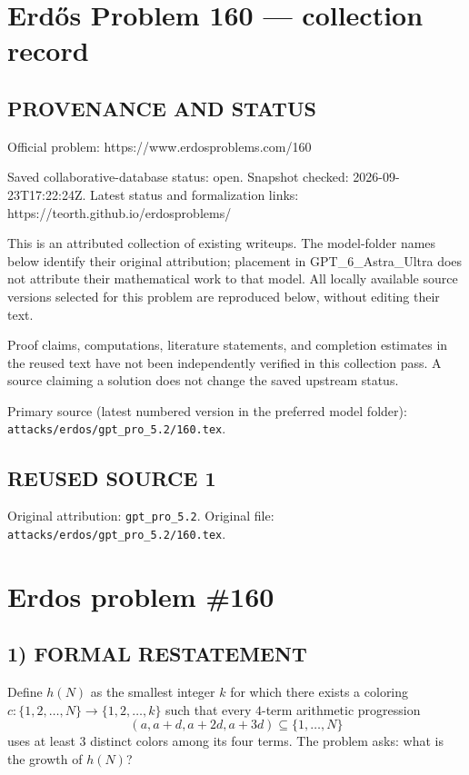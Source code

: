\section*{Erd\H{o}s Problem 160 --- collection record}

\subsection*{PROVENANCE AND STATUS}
Official problem: https://www.erdosproblems.com/160

Saved collaborative-database status: open.
Snapshot checked: 2026-09-23T17:22:24Z.
Latest status and formalization links: https://teorth.github.io/erdosproblems/

This is an attributed collection of existing writeups. The model-folder names below identify their original attribution; placement in GPT\_6\_Astra\_Ultra does not attribute their mathematical work to that model. All locally available source versions selected for this problem are reproduced below, without editing their text.

Proof claims, computations, literature statements, and completion estimates in the reused text have not been independently verified in this collection pass. A source claiming a solution does not change the saved upstream status.

Primary source (latest numbered version in the preferred model folder): \texttt{attacks/erdos/gpt\_pro\_5.2/160.tex}.

\subsection*{REUSED SOURCE 1}
Original attribution: \texttt{gpt\_pro\_5.2}.
Original file: \texttt{attacks/erdos/gpt\_pro\_5.2/160.tex}.

\section*{Erdos problem \#160}

\subsection*{1) FORMAL RESTATEMENT}
Define $h(N)$ as the smallest integer $k$ for which there exists a coloring $c:\{1,2,\dots,N\}\to\{1,2,\dots,k\}$ such that every $4$-term arithmetic progression
\[
(a, a+d, a+2d, a+3d)\subseteq\{1,\dots,N\}
\]
uses at least $3$ distinct colors among its four terms.
The problem asks: what is the growth of $h(N)$?

